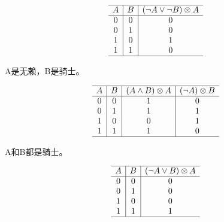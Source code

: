 {{\begin{practices}
            \begin{table}[H]
                \[
                    \begin{array}{c|c|c}
                        \hline
                        A & B & (\neg A \vee \neg B) \otimes A \\
                        \hline
                        0 & 0 & 0 \\
                        0 & 1 & 0 \\
                        1 & 0 & 1 \\
                        1 & 1 & 0 \\
                        \hline
                   \end{array}
               \]
            \end{table}
        \end{practices}

        \begin{practices}
            A是无赖，B是骑士。

            \begin{table}[H]
                \[
                    \begin{array}{c|c|c|c}
                        \hline
                        A & B & (A \wedge B) \otimes A & (\neg A) \otimes B \\
                        \hline
                        0 & 0 & 1 & 0 \\
                        0 & 1 & 1 & 1 \\
                        1 & 0 & 0 & 1 \\
                        1 & 1 & 1 & 0 \\
                        \hline
                   \end{array}
               \]
            \end{table}
        \end{practices}

        \begin{practices}
            A和B都是骑士。

            \begin{table}[H]
                \[
                    \begin{array}{c|c|c}
                        \hline
                        A & B & (\neg A \vee B) \otimes A \\
                        \hline
                        0 & 0 & 0 \\
                        0 & 1 & 0 \\
                        1 & 0 & 0 \\
                        1 & 1 & 1 \\
                        \hline
                   \end{array}
               \]
            \end{table}
        \end{practices}

}}
